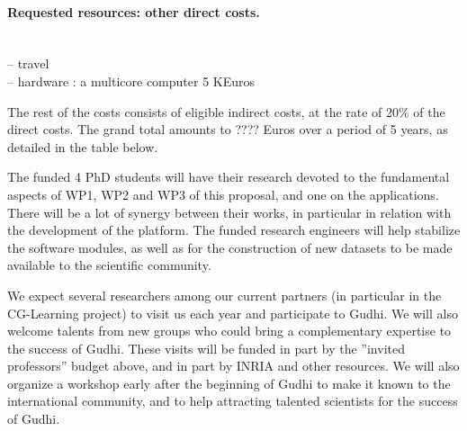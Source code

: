 \paragraph{Requested resources: other direct costs.}\mbox{}\\
-- travel \\
-- hardware : a multicore computer 5 KEuros

The rest of the costs consists of eligible indirect costs, at the rate of 20\% of the direct costs. 
The grand total amounts to ???? Euros over a period of 5 years, as detailed in the table below.


The funded 4 PhD students will have their research devoted to the fundamental aspects of WP1, WP2 and WP3 of this proposal, and one on the applications. There will be a lot of synergy between their works, in particular in relation with the development of the platform. The funded research engineers  will help stabilize the software modules, as well as for the construction of new datasets to be made available to the scientific community.

We expect several researchers among our current partners (in particular in the CG-Learning project) to visit us each year and participate to Gudhi. We will also welcome talents from new groups who could bring a complementary expertise to the success of Gudhi. These visits will be funded in part by the ”invited professors” budget above, and in part by INRIA and other resources.
We will also organize a workshop early after the beginning of Gudhi to make it known to the international community, and to help attracting talented scientists for the success of Gudhi.



